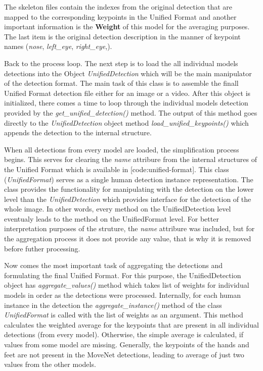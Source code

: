 The skeleton files contain the indexes from the original detection that are mapped to the corresponding keypoints in the Unified Format and another important information is the {\bf Weight} of this model for the averaging purposes. The last item is the original detection description in the manner of keypoint names ({\it nose}, {\it left_eye}, {\it right_eye},\edots).


Back to the process loop. The next step is to load the all individual models detections into the Object {\it UnifiedDetection} which will be the main manipulator of the detection format. The main task of this class is to assemble the finall Unified Format detection file either for an image or a video. After this object is initialized, there comes a time to loop through the individual models detection provided by the {\it get_unified_detection()} method. The output of this method goes directly to the {\it UnifiedDetection} object method {\it load_unified_keypoints()} which appends the detection to the internal structure.

When all detections from every model are loaded, the simplification process begins. This serves for clearing the {\it name} attribure from the internal structures of the Unified Format which is available in [code:unified-format]. This class ({\it UnifiedFormat}) serves as a single human detection instance representation. The class provides the functionality for manipulating with the detection on the lower level than the {\it UnifiedDetection} which provides interface for the detection of the whole image. In other words, every method on the UnifiedDetection level eventualy leads to the method on the UnifiedFormat level. For better interpretation purposes of the struture, the {\it name} attribure was included, but for the aggregation process it does not provide any value, that is why it is removed before futher processing.


Now comes the most important task of aggregating the detections and formulating the final Unified Format. For this purpose, the UnifiedDetection object has {\it aggregate_values()} method which takes list of weights for individual models in order as the detections were processed. Internally, for each human instance in the detection the {\it aggregate_instance()} method of the class {\it UnifiedFormat} is called with the list of weights as an argument. This method calculates the weighted average for the keypoints that are present in all individual detections (from every model). Otherwise, the simple average is calculated, if values from some model are missing. Generally, the keypoints of the hands and feet are not present in the MoveNet detections, leading to average of just two values from the other models.

